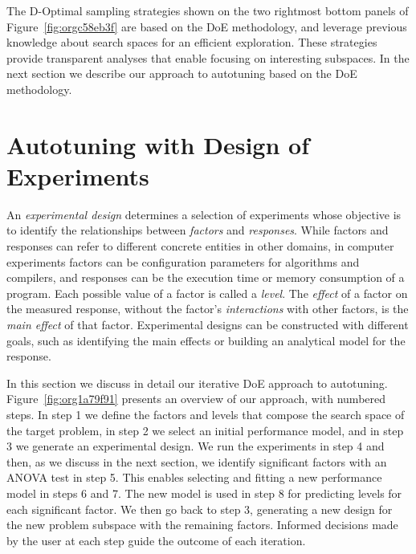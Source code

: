 \documentclass[conference]{IEEEtran}
\begin{document}
The D-Optimal sampling strategies shown on the two rightmost bottom panels of
Figure~\ref{fig:orgc58eb3f} are based on the DoE methodology, and
leverage previous knowledge about search spaces for an efficient exploration.
These strategies provide transparent analyses that enable focusing on
interesting subspaces. In the next section we describe our approach to
autotuning based on the DoE methodology.
\section{Autotuning with Design of Experiments}
\label{sec:org3d75309}
An \emph{experimental design} determines a selection of experiments whose objective
is to identify the relationships between \emph{factors} and \emph{responses}. While
factors and responses can refer to different concrete entities in other domains,
in computer experiments factors can be configuration parameters for algorithms
and compilers, and responses can be the execution time or memory consumption of
a program. Each possible value of a factor is called a \emph{level}. The \emph{effect} of
a factor on the measured response, without the factor's \emph{interactions} with
other factors, is the \emph{main effect} of that factor. Experimental designs can be
constructed with different goals, such as identifying the main effects or
building an analytical model for the response.

In this section we discuss in detail our iterative DoE approach to autotuning.
Figure~\ref{fig:org1a79f91} presents an overview of our approach, with
numbered steps. In step 1 we define the factors and levels that compose the
search space of the target problem, in step 2 we select an initial performance
model, and in step 3 we generate an experimental design. We run the experiments
in step 4 and then, as we discuss in the next section, we identify significant
factors with an ANOVA test in step 5. This enables selecting and fitting a new
performance model in steps 6 and 7. The new model is used in step 8 for
predicting levels for each significant factor. We then go back to step 3,
generating a new design for the new problem subspace with the remaining factors.
Informed decisions made by the user at each step guide the outcome of each
iteration.
\end{document}
